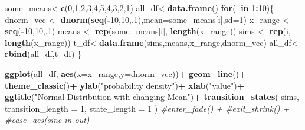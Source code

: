 \documentclass[
]{book}
\newenvironment{Shaded}{\begin{snugshade}}{\end{snugshade}}
\newcommand{\AttributeTok}[1]{\textcolor[rgb]{0.13,0.29,0.53}{#1}}
\newcommand{\CommentTok}[1]{\textcolor[rgb]{0.56,0.35,0.01}{\textit{#1}}}
\newcommand{\ControlFlowTok}[1]{\textcolor[rgb]{0.13,0.29,0.53}{\textbf{#1}}}
\newcommand{\DecValTok}[1]{\textcolor[rgb]{0.00,0.00,0.81}{#1}}
\newcommand{\FunctionTok}[1]{\textcolor[rgb]{0.13,0.29,0.53}{\textbf{#1}}}
\newcommand{\NormalTok}[1]{#1}
\newcommand{\OtherTok}[1]{\textcolor[rgb]{0.56,0.35,0.01}{#1}}
\newcommand{\SpecialCharTok}[1]{\textcolor[rgb]{0.81,0.36,0.00}{\textbf{#1}}}
\newcommand{\StringTok}[1]{\textcolor[rgb]{0.31,0.60,0.02}{#1}}
\begin{document}
\begin{Shaded}
\begin{Highlighting}[]
\NormalTok{some\_means}\OtherTok{\textless{}{-}}\FunctionTok{c}\NormalTok{(}\DecValTok{0}\NormalTok{,}\DecValTok{1}\NormalTok{,}\DecValTok{2}\NormalTok{,}\DecValTok{3}\NormalTok{,}\DecValTok{4}\NormalTok{,}\DecValTok{5}\NormalTok{,}\DecValTok{4}\NormalTok{,}\DecValTok{3}\NormalTok{,}\DecValTok{2}\NormalTok{,}\DecValTok{1}\NormalTok{)}
\NormalTok{all\_df}\OtherTok{\textless{}{-}}\FunctionTok{data.frame}\NormalTok{()}
\ControlFlowTok{for}\NormalTok{(i }\ControlFlowTok{in} \DecValTok{1}\SpecialCharTok{:}\DecValTok{10}\NormalTok{)\{}
\NormalTok{  dnorm\_vec }\OtherTok{\textless{}{-}} \FunctionTok{dnorm}\NormalTok{(}\FunctionTok{seq}\NormalTok{(}\SpecialCharTok{{-}}\DecValTok{10}\NormalTok{,}\DecValTok{10}\NormalTok{,.}\DecValTok{1}\NormalTok{),}\AttributeTok{mean=}\NormalTok{some\_means[i],}\AttributeTok{sd=}\DecValTok{1}\NormalTok{)}
\NormalTok{  x\_range   }\OtherTok{\textless{}{-}} \FunctionTok{seq}\NormalTok{(}\SpecialCharTok{{-}}\DecValTok{10}\NormalTok{,}\DecValTok{10}\NormalTok{,.}\DecValTok{1}\NormalTok{)}
\NormalTok{  means }\OtherTok{\textless{}{-}} \FunctionTok{rep}\NormalTok{(some\_means[i], }\FunctionTok{length}\NormalTok{(x\_range))}
\NormalTok{  sims }\OtherTok{\textless{}{-}} \FunctionTok{rep}\NormalTok{(i, }\FunctionTok{length}\NormalTok{(x\_range))}
\NormalTok{  t\_df}\OtherTok{\textless{}{-}}\FunctionTok{data.frame}\NormalTok{(sims,means,x\_range,dnorm\_vec)}
\NormalTok{  all\_df}\OtherTok{\textless{}{-}}\FunctionTok{rbind}\NormalTok{(all\_df,t\_df)}
\NormalTok{\}}

\FunctionTok{ggplot}\NormalTok{(all\_df, }\FunctionTok{aes}\NormalTok{(}\AttributeTok{x=}\NormalTok{x\_range,}\AttributeTok{y=}\NormalTok{dnorm\_vec))}\SpecialCharTok{+}
  \FunctionTok{geom\_line}\NormalTok{()}\SpecialCharTok{+}
  \FunctionTok{theme\_classic}\NormalTok{()}\SpecialCharTok{+}
  \FunctionTok{ylab}\NormalTok{(}\StringTok{"probability density"}\NormalTok{)}\SpecialCharTok{+}
  \FunctionTok{xlab}\NormalTok{(}\StringTok{"value"}\NormalTok{)}\SpecialCharTok{+}
  \FunctionTok{ggtitle}\NormalTok{(}\StringTok{"Normal Distribution with changing Mean"}\NormalTok{)}\SpecialCharTok{+}
   \FunctionTok{transition\_states}\NormalTok{(}
\NormalTok{    sims,}
    \AttributeTok{transition\_length =} \DecValTok{1}\NormalTok{,}
    \AttributeTok{state\_length =} \DecValTok{1}
\NormalTok{  )}
  \CommentTok{\#enter\_fade() + }
  \CommentTok{\#exit\_shrink() +}
  \CommentTok{\#ease\_aes(\textquotesingle{}sine{-}in{-}out\textquotesingle{})}
\end{Highlighting}
\end{Shaded}
\end{document}
